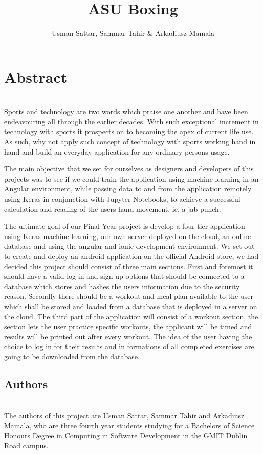 \documentclass[a4paper,12pt]{report}
\begin{document}
\title{ASU Boxing}
\author{Usman Sattar, Sammar Tahir \& Arkadiusz Mamala}

\maketitle
\preface
\section*{Abstract}
\\
Sports and technology are two words which praise one another and have been endeavouring all through the earlier decades. With such exceptional increment in technology with sports it prospects on to becoming the apex of current life use. As such, why not apply such concept of technology with sports working hand in hand and build an everyday application for any ordinary persons usage.

The main objective that we set for ourselves as designers and developers of this projects was to see if we could train the application using machine learning in an Angular environment, while passing 
data to and from the application remotely using Keras in conjunction with Jupyter Notebooks, to achieve a successful calculation and reading of the users hand movement, ie. a jab punch.

The ultimate goal of our Final Year project is develop a four tier application using Keras machine learning, our own server deployed on the cloud, an online database and using the angular and ionic development environment.
We set out to create and deploy an android application on the official Android store, we had decided this project should consist of three main sections. 
First and foremost it should have a valid log in and sign up options that should be connected to a database which stores and hashes the users information due to the security reason. 
Secondly there should be a workout and meal plan available to the user which shall be stored and loaded from a database that is deployed in a server on the cloud.
The third part of the application will consist of a workout section, the section lets the user practice specific workouts, the applicant will be timed and results will be printed out after every workout. 
The idea of the user having the choice to log in for their results and in formations of all completed exercises are going to be downloaded from the database.

\subsection*{Authors}
\\
The authors of this project are Usman Sattar, Sammar Tahir and
Arkadiusz Mamala, who are three fourth year students studying for a
Bachelors of Science Honours Degree in Computing in Software
Development in the GMIT Dublin Road campus.
    
\end{document}
